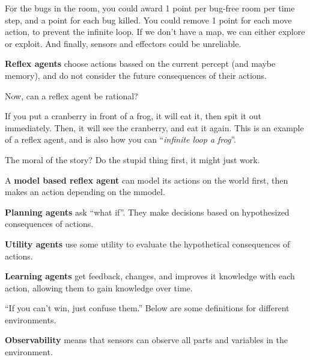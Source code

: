 \begin{eg}
	For the bugs in the room, you could award 1 point per bug-free room per time step, and a point for each bug killed. You could remove 1 point for each move action, to prevent the infinite loop. If we don't have a map, we can either explore or exploit. And finally, sensors and effectors could be unreliable.
\end{eg}

\begin{definition}
	\textbf{Reflex agents} choose actions bassed on the current percept (and maybe memory), and do not consider the future consequences of their actions.
\end{definition}

Now, can a reflex agent be rational?

\begin{eg}
	If you put a cranberry in front of a frog, it will eat it, then spit it out immediately. Then, it will see the cranberry, and eat it again. This is an example of a reflex agent, and is also how you can ``\textit{infinite loop a frog}''.
\end{eg}

The moral of the story? Do the stupid thing first, it might just work.

\begin{definition}
	A \textbf{model based reflex agent} can model its actions on the world first, then makes an action depending on the mmodel.
\end{definition}

\begin{definition}
	\textbf{Planning agents} ask ``what if''. They make decisions based on hypothesized consequences of actions.
\end{definition}

\begin{definition}
	\textbf{Utility agents} use some utility to evaluate the hypothetical consequences of actions.
\end{definition}

\begin{definition}
	\textbf{Learning agents} get feedback, changes, and improves it knowledge with each action, allowing them to gain knowledge over time.
\end{definition}

``If you can't win, just confuse them.'' Below are some definitions for different environments.

\begin{definition}
	\textbf{Observability} means that sensors can observe all parts and variables in the environment.
\end{definition}

